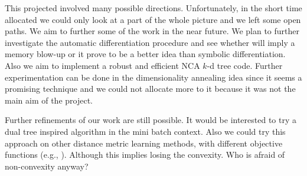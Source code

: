 This projected involved many possible directions. Unfortunately, in the short time allocated we could only look at a part of the whole picture and we left some open paths. We aim to further some of the work in the near future. We plan to further investigate the automatic differentiation procedure and see whether will imply a memory blow-up or it prove to be a better idea than symbolic differentiation. Also we aim to implement a robust and efficient NCA $k$-d tree code. Further experimentation can be done in the dimensionality annealing idea since it seems a promising technique and we could not allocate more to it because it was not the main aim of the project. 

Further refinements of our work are still possible. It would be interested to try a dual tree \citep{gray2003} inspired algorithm in the mini batch context. Also we could try this approach on other distance metric learning methods, with different objective functions (e.g., \citealp{xing2003}). Although this implies losing the convexity. Who is afraid of non-convexity anyway?